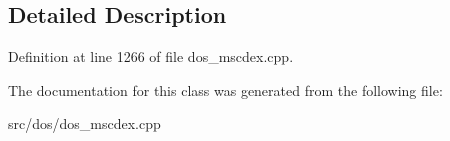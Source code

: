 \subsection{Detailed Description}


Definition at line 1266 of file dos\-\_\-mscdex.\-cpp.



The documentation for this class was generated from the following file\-:\begin{DoxyCompactItemize}
\item 
src/dos/dos\-\_\-mscdex.\-cpp\end{DoxyCompactItemize}
